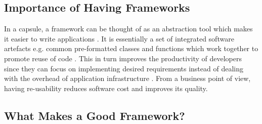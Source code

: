 \subsection{Importance of Having Frameworks}
\label{subsec:importance-of-having-frameworks}

In a capsule, a framework can be thought of as an abstraction tool which makes it easier to write applications \cite{1stwebdesigner}. It is essentially a set of integrated software artefacts e.g. common pre-formatted classes and functions which work together to promote reuse of code \cite{framework-report-vamderbilt}. This in turn improves the productivity of developers since they can focus on implementing desired requirements instead of dealing with the overhead of application infrastructure \cite{cimetrix}. From a business point of view, having re-usability reduces software cost and improves its quality.

\subsection{What Makes a Good Framework?}
\label{subsec:what-makes-a-good-framework}


